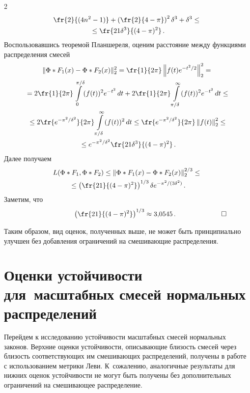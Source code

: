 \begin{multicols}{2}
\begin{multline*}
\fr{2}{(4n^2 - 1 )}+
\left(\fr{ 2 }{4-\pi} \right)^2 \delta^3  + \delta^3 \le{}\\
{}\le
\fr{21 \delta^3 }{(4-\pi)^2}\,.
\end{multline*}
Воспользовавшись теоремой Планшереля, оценим расстояние между
функциями распределения смесей
\begin{multline*}
\| \Phi\ast F_1(x) - \Phi\ast F_2(x) \|_2^2 = \fr{1}{2\pi}
\left\| f(t) e^{-{t^2}/{2}} \right\|_2^2 =
{}\\{}
= 2 \fr{1}{2\pi} \int\limits_0^{{\pi}/{\delta}}
(f(t))^2 e^{- {t^2} }\,dt + 2
\fr{1}{2\pi} \int\limits_{{\pi}/{\delta}}^\infty (f(t))^2 e^{- {t^2} }\,dt   \le
{}\\
{}\le 2
\fr{e^{- \pi^2/\delta^2 }}{2\pi}
\int\limits_{{\pi}/{\delta}}^\infty (f(t))^2 \,dt
\le
\fr{e^{- \pi^2/\delta^2 }}{2\pi}
\left\| f(t) \right\|_2^2 \le{}\\
{}\le
e^{- \pi^2/\delta^2}
\fr{21 \delta^3 }{(4-\pi)^2}\,.
\end{multline*}
Далее получаем
\begin{multline*}
L(\Phi\ast F_1, \Phi\ast F_2)
\le
\| \Phi\ast F_1(x) - \Phi\ast F_2(x) \|_2^{{2}/{3}}
\le{}\\
{}\le
\left(\fr{21 }{(4-\pi)^2}\right)^{1/3}
\delta e^{- \pi^2/(3\delta^2)}\,.
\end{multline*}
Заметим, что 
$$
~~~~~~~~~~~~~~~~~~~~\left(\fr{21 }{(4-\pi)^2}\right)^{1/3}\approx 3{,}0545\,.~~~~~~~~~~~~~~~~~~~~\square
$$



Таким образом, вид оценок, полученных выше, не может быть
принципиально улучшен без добавления ограничений на смешивающие
распределения.

\section{Оценки устойчивости для~масштабных смесей нормальных распределений}

Перейдем к исследованию устойчивости масштабных смесей нормальных
законов. Верхние оценки устойчивости, описывающие близость смесей
через близость соответствующих им смешивающих распределений,
получены в работе~\cite{NazStab} с использованием метрики Леви. 
К~сожалению, аналогичные результаты для нижних оценок устойчивости не
могут быть получены без дополнительных ограничений на смешивающее
распределение.

\bigskip


\end{multicols}
